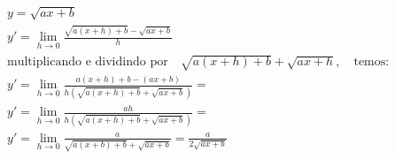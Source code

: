 \begin{ex}
\begin{align}
&y=\sqrt{ax+b}\nonumber\\
&y'=\lim_{h\rightarrow 0} \frac{\sqrt{a(x+h)+b}-\sqrt{ax+b}}{h}\nonumber\\
&\text{multiplicando e dividindo por}\quad \sqrt{a(x+h)+b}+\sqrt{ax+h},\quad\text{temos:}\nonumber\\
&y'=\lim_{h\rightarrow 0} \frac{a(x+h)+b-(ax+b)}{h(\sqrt{a(x+h)+b}+\sqrt{ax+b})}=\nonumber\\
&y'=\lim_{h\rightarrow 0} \frac{ah}{h(\sqrt{a(x+h)+b}+\sqrt{ax+b})}=\nonumber\\
&y'=\lim_{h\rightarrow 0} \frac{a}{\sqrt{a(x+b)+b}+\sqrt{ax+b}}=\frac{a}{2\sqrt{ax+b}}\nonumber
\end{align}
\end{ex}